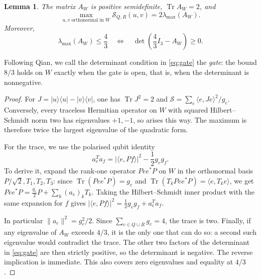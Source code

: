 \documentclass[11pt,a4paper]{article}
\numberwithin{equation}{section}
\newtheorem{lemma}[theorem]{Lemma}
\theoremstyle{remark}\newtheorem{remark}[theorem]{Remark}
\DeclareMathOperator{\Tr}{Tr}
\newcommand{\proj}[1]{|#1\rangle\langle #1|}
\begin{document}
\begin{lemma}\label{lem:frame}
The matrix $A_W$ is positive semidefinite, $\Tr A_W=2$, and
\begin{equation}
\max_{u,v\text{ orthonormal in }W}\mathcal S_{Q,R}(u,v)
=2\lambda_{\max}(A_W).
\end{equation}
Moreover,
\begin{equation}
\lambda_{\max}(A_W)\le\frac43
\quad\Longleftrightarrow\quad
\det\left(\frac43I_3-A_W\right)\ge0.
\label{eq:gate}
\end{equation}
\end{lemma}
Following Qian, we call the determinant condition in \eqref{eq:gate} the \emph{gate}: the bound $8/3$ holds on $W$ exactly when the gate is open, that is, when the determinant is nonnegative.
\begin{proof}
For $J=\proj{u}-\proj{v}$, one has $\Tr J^2=2$ and
$\mathcal S=\sum_e\langle e,Je\rangle^2/g_e$. Conversely, every traceless Hermitian operator on $W$ with squared Hilbert--Schmidt norm two has eigenvalues $+1,-1$, so arises this way. The maximum is therefore twice the largest eigenvalue of the quadratic form.

For the trace, we use the polarised qubit identity
\begin{equation}
a_e^Ta_f=|\langle e,Pf\rangle|^2-\frac12g_eg_f.
\label{eq:polarised}
\end{equation}
To derive it, expand the rank-one operator $Pee^*P$ on $W$ in the orthonormal basis $P/\sqrt2,T_1,T_2,T_3$: since $\Tr(Pee^*P)=g_e$ and $\Tr(T_kPee^*P)=\langle e,T_ke\rangle$, we get $Pee^*P=\tfrac{g_e}{2}P+\sum_k(a_e)_kT_k$. Taking the Hilbert--Schmidt inner product with the same expansion for $f$ gives $|\langle e,Pf\rangle|^2=\tfrac12g_eg_f+a_e^Ta_f$.

In particular $\|a_e\|^2=g_e^2/2$. Since $\sum_{e\in Q\cup R}g_e=4$, the trace is two. Finally, if any eigenvalue of $A_W$ exceeds $4/3$, it is the only one that can do so: a second such eigenvalue would contradict the trace. The other two factors of the determinant in \eqref{eq:gate} are then strictly positive, so the determinant is negative. The reverse implication is immediate. This also covers zero eigenvalues and equality at $4/3$.
\end{proof}
\end{document}
